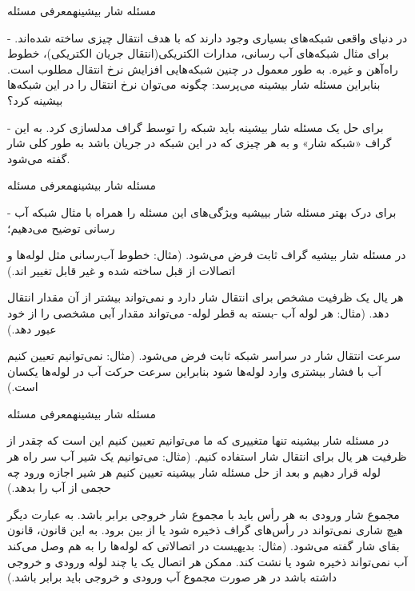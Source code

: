 \begin{itemframe}{مسئله شار بیشینه}{معرفی مسئله}
\item [-]
در دنیای واقعی شبکه‌های بسیاری وجود دارند که با هدف انتقال چیزی ساخته شده‌اند. برای مثال شبکه‌های آب رسانی، مدارات الکتریکی(انتقال جریان الکتریکی)، خطوط راه‌آهن و غیره. به طور معمول در چنین شبکه‌هایی افزایش نرخ انتقال مطلوب است. بنابراین مسئله شار بیشینه می‌پرسد‌: چگونه می‌توان نرخ انتقال را در این شبکه‌ها بیشینه کرد؟
\item [-]
برای حل یک مسئله شار بیشینه باید شبکه را توسط گراف مدلسازی کرد. به این گراف «شبکه شار»
و به هر چیزی که در این شبکه در جریان باشد به طور کلی شار
 گفته می‌شود.
\end{itemframe}

\begin{itemframe}{مسئله شار بیشینه}{معرفی مسئله}
	\item [-]
برای درک بهتر مسئله شار بییشیه ويژگی‌های این مسئله را همراه با مثال شبکه آب رسانی توضیح می‌دهیم؛
	\item
در مسئله شار بیشیه گراف ثابت فرض می‌شود. (مثال: خطوط آب‌رسانی مثل لوله‌ها و اتصالات از قبل ساخته شده‌ و غیر قابل تغییر اند.)
	\item
هر یال یک ظرفیت مشخص برای انتقال شار دارد و نمی‌تواند بیشتر از آن مقدار انتقال دهد. (مثال: هر لوله آب -بسته به قطر لوله‌- می‌تواند مقدار آبی مشخصی را از خود عبور دهد.)
	\item
سرعت انتقال شار در سراسر شبکه ثابت فرض می‌شود. (مثال: نمی‌توانیم تعیین کنیم آب با فشار بیشتری وارد لوله‌ها شود بنابراین سرعت حرکت آب در لوله‌ها یکسان است.)
\end{itemframe}

\begin{itemframe}{مسئله شار بیشینه}{معرفی مسئله}

	\item
در مسئله شار بیشینه تنها متغییری که ما می‌توانیم تعیین کنیم این است که چقدر از ظرفیت هر یال برای انتقال شار استفاده کنیم. (مثال: می‌توانیم یک شیر آب سر راه هر لوله قرار دهیم و بعد از حل مسئله شار بیشینه تعیین کنیم هر شیر اجازه ورود چه حجمی از آب را بدهد.)
	\item
مجموع شار ورودی به هر رأس باید با مجموع شار خروجی برابر باشد. به عبارت دیگر هیچ شاری نمی‌تواند در رأس‌های گراف ذخیره شود یا از بین برود. به این قانون، قانون بقای شار
گفته می‌شود.
(مثال: بدیهیست در اتصالاتی که لوله‌ها را به هم وصل می‌کند آب نمی‌تواند ذخیره شود یا نشت کند. ممکن هر اتصال یک یا چند لوله ورودی و خروجی داشته باشد در هر صورت مجموع آب ورودی و خروجی باید برابر باشد.)

\end{itemframe}

